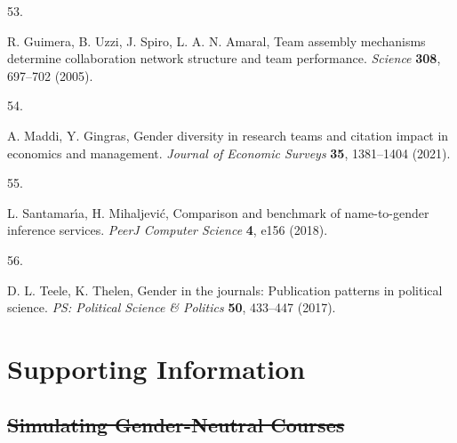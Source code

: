 \documentclass[
  11pt, %
]{article}
\newlength{\cslhangindent}
\newlength{\csllabelwidth}
\newenvironment{CSLReferences}[2] %
 {\begin{list}{}{%
  \setlength{\itemindent}{0pt}
  \setlength{\leftmargin}{0pt}
  \setlength{\parsep}{0pt}
  \ifodd #1
   \setlength{\leftmargin}{\cslhangindent}
   \setlength{\itemindent}{-1\cslhangindent}
  \fi
  \setlength{\itemsep}{#2\baselineskip}}}
 {\end{list}}
\newcommand{\CSLLeftMargin}[1]{\parbox[t]{\csllabelwidth}{\strut#1\strut}}
\newcommand{\CSLRightInline}[1]{\parbox[t]{\linewidth - \csllabelwidth}{\strut#1\strut}}
\providecommand{\DIFadd}[1]{{\protect\color{blue}\uwave{#1}}} %
\providecommand{\DIFdel}[1]{{\protect\color{red}\sout{#1}}}                      %
\providecommand{\DIFaddbegin}{} %
\providecommand{\DIFaddend}{} %
\providecommand{\DIFdelbegin}{} %
\providecommand{\DIFdelend}{} %
\newcommand{\DIFscaledelfig}{0.5}
\newlength{\DIFdelgraphicswidth} %
\newlength{\DIFdelgraphicsheight} %
\newcommand{\DIFaddincludegraphics}[2][]{{\color{blue}\fbox{\DIFOincludegraphics[#1]{#2}}}} %
\newcommand{\DIFdelincludegraphics}[2][]{%
\sbox{\DIFdelgraphicsbox}{\DIFOincludegraphics[#1]{#2}}%
\settoboxwidth{\DIFdelgraphicswidth}{\DIFdelgraphicsbox} %
\settoboxtotalheight{\DIFdelgraphicsheight}{\DIFdelgraphicsbox} %
\scalebox{\DIFscaledelfig}{%
\parbox[b]{\DIFdelgraphicswidth}{\usebox{\DIFdelgraphicsbox}\\[-\baselineskip] \rule{\DIFdelgraphicswidth}{0em}}\llap{\resizebox{\DIFdelgraphicswidth}{\DIFdelgraphicsheight}{%
\setlength{\unitlength}{\DIFdelgraphicswidth}%
\begin{picture}(1,1)%
\thicklines\linethickness{2pt} %
{\color[rgb]{1,0,0}\put(0,0){\framebox(1,1){}}}%
{\color[rgb]{1,0,0}\put(0,0){\line( 1,1){1}}}%
{\color[rgb]{1,0,0}\put(0,1){\line(1,-1){1}}}%
\end{picture}%
}\hspace*{3pt}}} %
} %
\DeclareRobustCommand{\DIFaddbegin}{\DIFOaddbegin \let\includegraphics\DIFaddincludegraphics} %
\DeclareRobustCommand{\DIFaddend}{\DIFOaddend \let\includegraphics\DIFOincludegraphics} %
\DeclareRobustCommand{\DIFdelbegin}{\DIFOdelbegin \let\includegraphics\DIFdelincludegraphics} %
\DeclareRobustCommand{\DIFdelend}{\DIFOaddend \let\includegraphics\DIFOincludegraphics} %
\begin{document}
\begin{CSLReferences}{0}{1}
\CSLLeftMargin{53. }%
\CSLRightInline{R. Guimera, B. Uzzi, J. Spiro, L. A. N. Amaral, Team assembly mechanisms determine collaboration network structure and team performance. \emph{Science} \textbf{308}, 697--702 (2005).}

\CSLLeftMargin{54. }%
\CSLRightInline{A. Maddi, Y. Gingras, Gender diversity in research teams and citation impact in economics and management. \emph{Journal of Economic Surveys} \textbf{35}, 1381--1404 (2021).}

\CSLLeftMargin{55. }%
\CSLRightInline{L. Santamarı́a, H. Mihaljević, Comparison and benchmark of name-to-gender inference services. \emph{PeerJ Computer Science} \textbf{4}, e156 (2018).}

\CSLLeftMargin{56. }%
\CSLRightInline{D. L. Teele, K. Thelen, Gender in the journals: Publication patterns in political science. \emph{PS: Political Science \& Politics} \textbf{50}, 433--447 (2017).}

\end{CSLReferences}

\DIFaddend \newpage
\appendix
\renewcommand{\thefigure}{SI-\arabic{figure}}
\renewcommand{\thesection}{SI}
\renewcommand{\thesubsection}{SI-\arabic{subsection}}
\DIFaddbegin 

\DIFaddend \setcounter{figure}{0}
\DIFaddbegin \setcounter{table}{0}
\DIFaddend \setcounter{section}{0}
\setcounter{subsection}{0}
\renewcommand{\thetable}{SI-\arabic{table}}

\section{Supporting Information}\label{supporting-information}

\subsection{\DIFdelbegin \DIFdel{Simulating Gender-Neutral Courses}\DIFdelend \DIFaddbegin \DIFadd{Data}\DIFaddend }\DIFdelbegin %
\DIFdelend \DIFaddbegin \label{data}
\DIFaddend 
\end{document}
